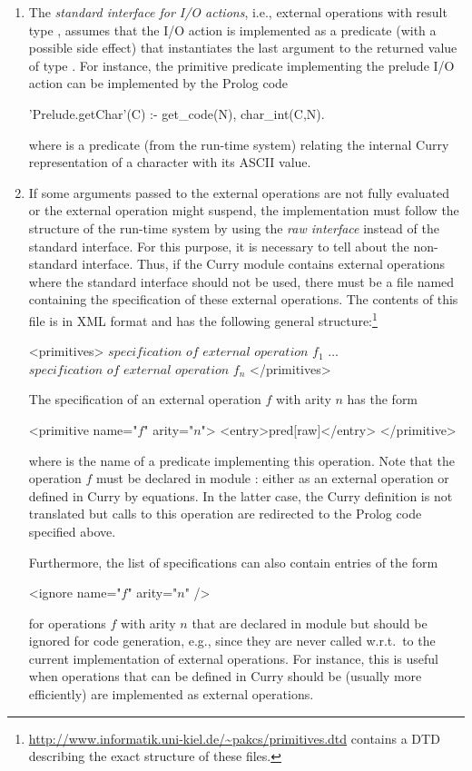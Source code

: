 \begin{enumerate}
\item
The \emph{standard interface for I/O actions}, i.e., external operations
with result type , assumes that the I/O action
is implemented as a predicate (with a possible side effect)
that instantiates the last argument to the returned value of type .
For instance, the primitive predicate 
implementing the prelude I/O action 
can be implemented by the Prolog code
\begin{curry}
'Prelude.getChar'(C) :- get_code(N), char_int(C,N).
\end{curry}
where  is a predicate (from the \CYS run-time system)
relating the internal Curry representation of a character
with its ASCII value.

\item
If some arguments passed to the external operations are not fully evaluated
or the external operation might suspend, the implementation must follow
the structure of the \CYS run-time system by using the \emph{raw interface}
instead of the standard interface.
For this purpose, it is necessary to tell \CYS about the
non-standard interface.
Thus, if the Curry module  contains external operations
where the standard interface should not be used,
there must be a file named  containing the
specification of these external operations. The contents of this file
is in XML format and has the following general structure:\footnote{%
\url{http://www.informatik.uni-kiel.de/~pakcs/primitives.dtd} contains a DTD
describing the exact structure of these files.}
\begin{curry}
<primitives>
  $\textit{specification of external operation~}f_1$
  $\ldots$
  $\textit{specification of external operation~}f_n$
</primitives>
\end{curry}
The specification of an external operation $f$
with arity $n$ has the form
\begin{curry}
<primitive name="$f$" arity="$n$">
  <entry>pred[raw]</entry>
</primitive>
\end{curry}
where  is the name of a predicate
implementing this operation. Note that the operation $f$ must be
declared in module : either as an external operation
or defined in Curry by equations. In the latter case,
the Curry definition is not translated but calls to this operation
are redirected to the Prolog code specified above.

Furthermore, the list of specifications can also contain entries of the form
\begin{curry}
<ignore name="$f$" arity="$n$" />
\end{curry}
for operations $f$ with arity $n$ that are declared in module 
but should be ignored for code generation, e.g., since they are
never called w.r.t.\ to the current implementation of external operations.
For instance, this is useful when operations that can
be defined in Curry should be (usually more efficiently) are implemented
as external operations.


\end{enumerate}
